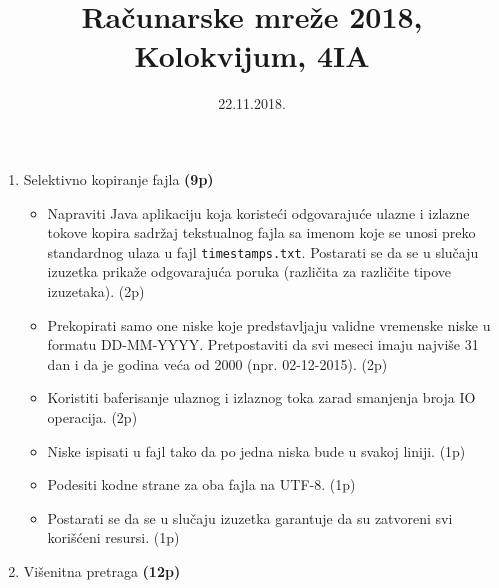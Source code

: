 \documentclass[]{article}
\title{Ra\v{c}unarske mre\v{z}e 2018, Kolokvijum, 4IA}
\author{}
\date{22.11.2018.}
\begin{document}
\maketitle

\begin{enumerate}
  \item Selektivno kopiranje fajla \textbf{(9p)}
  \begin{itemize}
    \item Napraviti Java aplikaciju koja koriste\'c{}i odgovaraju\'c{}e ulazne i izlazne tokove kopira sadr\v{z}aj tekstualnog fajla sa imenom koje se unosi preko standardnog ulaza u fajl \texttt{timestamps.txt}. Postarati se da se u slu\v{c}aju izuzetka prika\v{z}e odgovaraju\'c{}a poruka (razli\v{c}ita za razli\v{c}ite tipove izuzetaka). \hfill (2p)
    \item Prekopirati samo one niske koje predstavljaju validne vremenske niske u formatu DD-MM-YYYY. Pretpostaviti da svi meseci imaju najvi\v{s}e 31 dan i da je godina ve\'c{}a od 2000 (npr. 02-12-2015). \hfill (2p)
    \item Koristiti baferisanje ulaznog i izlaznog toka zarad smanjenja broja IO operacija. \hfill (2p)
    \item Niske ispisati u fajl tako da po jedna niska bude u svakoj liniji. \hfill (1p)
    \item Podesiti kodne strane za oba fajla na UTF-8. \hfill (1p)
    \item Postarati se da se u slu\v{c}aju izuzetka garantuje da su zatvoreni svi kori\v{s}\'c{}eni resursi. \hfill (1p)
  \end{itemize}

  \item Vi\v{s}enitna pretraga \textbf{(12p)}


\end{enumerate}
\end{document}
